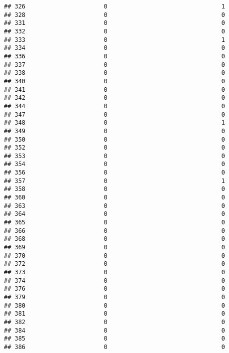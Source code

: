 \documentclass[
]{article}
\begin{document}
\begin{verbatim}
## 326                      0                                1
## 328                      0                                0
## 331                      0                                0
## 332                      0                                0
## 333                      0                                1
## 334                      0                                0
## 336                      0                                0
## 337                      0                                0
## 338                      0                                0
## 340                      0                                0
## 341                      0                                0
## 342                      0                                0
## 344                      0                                0
## 347                      0                                0
## 348                      0                                1
## 349                      0                                0
## 350                      0                                0
## 352                      0                                0
## 353                      0                                0
## 354                      0                                0
## 356                      0                                0
## 357                      0                                1
## 358                      0                                0
## 360                      0                                0
## 363                      0                                0
## 364                      0                                0
## 365                      0                                0
## 366                      0                                0
## 368                      0                                0
## 369                      0                                0
## 370                      0                                0
## 372                      0                                0
## 373                      0                                0
## 374                      0                                0
## 376                      0                                0
## 379                      0                                0
## 380                      0                                0
## 381                      0                                0
## 382                      0                                0
## 384                      0                                0
## 385                      0                                0
## 386                      0                                0

\end{verbatim}
\end{document}
